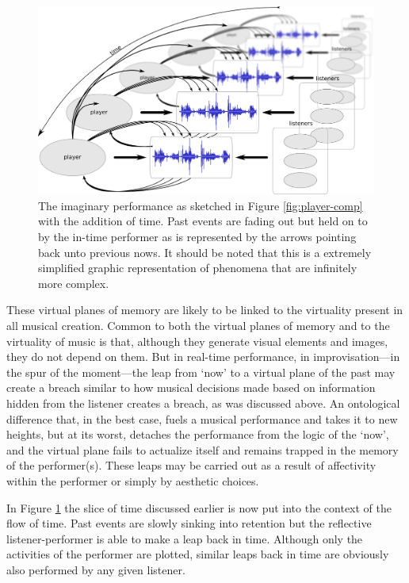 \begin{figure}[htb]
  \centering
  \includegraphics[width=\linewidth]{img/players-perspective}
  \caption{The imaginary performance as sketched in Figure \ref{fig:player-comp} with the addition of time. Past events are fading out but held on to by the in-time performer as is represented by the arrows pointing back unto previous nows. It should be noted that this is a extremely simplified graphic representation of phenomena that are infinitely more complex.}
  \label{fig:u}
\end{figure}

These virtual planes of memory are likely to be linked to the virtuality present in all musical creation. Common to both the virtual planes of memory and to the virtuality of music is that, although they generate visual elements and images, they do not depend on them.
But in real-time performance, in improvisation---in the spur of the moment---the leap from `now' to a virtual plane of the past may create a breach similar to how musical decisions made based on information hidden from the listener creates a breach, as was discussed above. An ontological difference that, in the best case, fuels a musical performance and takes it to new heights, but at its worst, detaches the performance from the logic of the `now', and the virtual plane fails to actualize itself and remains trapped in the memory of the performer(s). These leaps may be carried out as a result of affectivity within the performer or simply by aesthetic choices.

In Figure \ref{fig:u} the slice of time discussed earlier is now put into the context of the flow of time. Past events are slowly sinking into retention but the reflective listener-performer is able to make a leap back in time. Although only the activities of the performer are plotted, similar leaps back in time are obviously also performed by any given listener.

